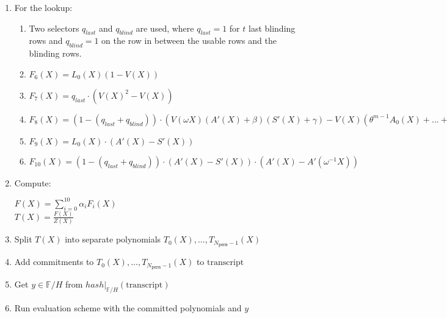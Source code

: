 \begin{enumerate}
\begin{center}
            $F_1(X) = L_1(X)(Q(X) - 1)$ \\
            $F_2(X) = P(X)p'(X) - P(X\omega)$ \\
            $F_3(X) = Q(X)q'(X) - Q(X\omega)$ \\
            $F_4(X) = L_n(X)(P(X\omega) - Q(X\omega))$ \\
            $F_5(X) = \sum\limits_{0 \leq i < N_{\texttt{sel}}} (\tau^i \cdot \textbf{q}_{i}(X) \cdot \texttt{gate}_i(X))
            + \sum\limits_{0 \leq i < N_{\texttt{const}}}(\textbf{f}_{c_i}(X)) + PI(X)$
        \end{center}
    \item For the lookup:
        \begin{enumerate}
            \item Two selectors $q_{last}$ and $q_{blind}$ are used, where $q_{last} = 1$ for $t$ last blinding rows and $q_{blind} = 1$ on the row in between the usable rows and the blinding rows.
            \item $F_6(X) = L_0(X) (1 - V(X))$
            \item $F_7(X) = q_{last} \cdot (V(X)^2 - V(X))$
            \item $F_8(X) = (1 - (q_{last} + q_{blind})) \cdot ( V(\omega X) (A'(X) + \beta) (S'(X) + \gamma) - V(X) (\theta^{m-1} A_0(X) + ... + A_{m-1}(X) + \beta) (\theta^{m-1} S_0(X) + ... + S_{m-1}(X) + \gamma) )$
            \item $F_9(X) = L_0(X) \cdot (A'(X) - S'(X))$
            \item $F_{10}(X) = (1 - (q_{last} + q_{blind})) \cdot (A'(X) - S'(X))\cdot(A'(X) - A'(\omega^{-1} X))$
        \end{enumerate}
    \item Compute:
        \begin{center}
            $F(X) = \sum\limits_{i = 0}^{10} \alpha_iF_i(X)$ \\
            $T(X) = \frac{F(X)}{Z(X)}$
        \end{center}
    \item Split $T(X)$ into separate polynomials $T_0(X), ..., T_{N_{\texttt{perm}} - 1}(X)$
    \item Add commitments to $T_0(X), ..., T_{N_{\texttt{perm}} - 1}(X)$ to $\text{transcript}$
    \item Get $y \in \mathbb{F}/H$ from $hash|_{\mathbb{F}/H}(\text{transcript})$
    \item Run evaluation scheme with the committed polynomials and $y$ \\

\end{enumerate}
